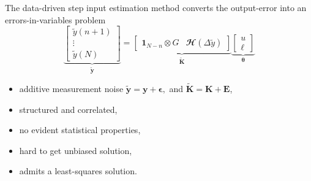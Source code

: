 \documentclass[presentation]{beamer}
\begin{document}
\begin{frame}[label={slide:preliminaries7}]{The data-driven step input estimation method converts \linebreak  the output-error into an errors-in-variables problem}
\begin{equation*} \underbrace{ \begin{bmatrix} \widetilde{y}(n+1) \\ \vdots \\ \widetilde{y}(N) \end{bmatrix}}_{\widetilde{\mathbf{y}}} = \underbrace{ \begin{bmatrix} \mathbf{1}_{N-n} \otimes G & \mathbfcal{H}\left(\Delta {\widetilde{y}}\right) \end{bmatrix}}_{\widetilde{\mathbf{K}}} \underbrace{ \begin{bmatrix} u \\ \bm{\ell} \end{bmatrix} }_{\bm{\theta}} \end{equation*}
\begin{itemize}
	\item additive measurement noise $\widetilde{\mathbf{y}} = \mathbf{y} + \bm{\epsilon},$ and $\widetilde{\mathbf{K}} = \mathbf{K} + \mathbf{E}$, 
	\item structured and correlated, 
	\item no evident statistical properties,
	\item hard to get unbiased solution, 
	\item admits a least-squares solution.
\end{itemize}
\end{frame}
\end{document}
